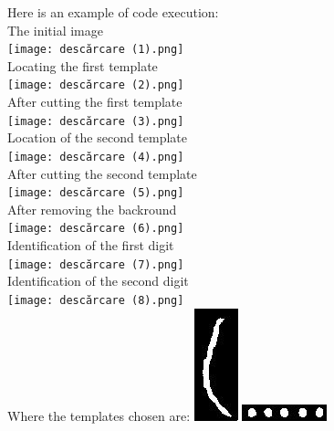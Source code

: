 \documentclass[12pt]{article}
\begin{document}
Here is an example of code execution:\\
The initial image\\
\texttt{[image: descărcare (1).png]}\\
Locating the first template\\
\texttt{[image: descărcare (2).png]}\\
After cutting the first template\\
\texttt{[image: descărcare (3).png]}\\
Location of the second template\\
\texttt{[image: descărcare (4).png]}\\
After cutting the second template\\
\texttt{[image: descărcare (5).png]}\\
After removing the backround\\
\texttt{[image: descărcare (6).png]}\\
Identification of the first digit\\
\texttt{[image: descărcare (7).png]}\\
Identification of the second digit\\
\texttt{[image: descărcare (8).png]}\\

Where the templates chosen are:
\includegraphics[scale=1]{template_matching.JPG}
\includegraphics[scale=1]{template_matching2.JPG}
\end{document}
